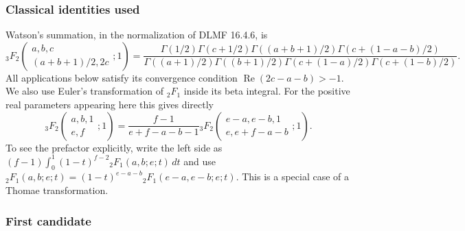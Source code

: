 \documentclass[11pt,a4paper]{article}
\theoremstyle{definition}
\theoremstyle{remark}
\numberwithin{equation}{section}
\begin{document}
\subsubsection{Classical identities used}

Watson's summation, in the normalization of DLMF 16.4.6, is
\begin{equation}\label{extra8-eq:double12-watson}
 {}_3F_2\left(\begin{matrix}a,b,c\\(a+b+1)/2,2c\end{matrix};1\right)
 =\frac{\Gamma(1/2)\Gamma(c+1/2)\Gamma((a+b+1)/2)
              \Gamma(c+(1-a-b)/2)}
             {\Gamma((a+1)/2)\Gamma((b+1)/2)
              \Gamma(c+(1-a)/2)\Gamma(c+(1-b)/2)}.
\end{equation}
All applications below satisfy its convergence condition
$\operatorname{Re}(2c-a-b)>-1$.
We also use Euler's transformation of ${}_2F_1$ inside its beta integral.
For the positive real parameters appearing here this gives directly
\begin{equation}\label{extra8-eq:double12-euler}
 {}_3F_2\left(\begin{matrix}a,b,1\\e,f\end{matrix};1\right)
 =\frac{f-1}{e+f-a-b-1}
 {}_3F_2\left(\begin{matrix}e-a,e-b,1\\e,e+f-a-b\end{matrix};1\right).
\end{equation}
To see the prefactor explicitly, write the left side as
$(f-1)\int_0^1(1-t)^{f-2}{}_2F_1(a,b;e;t)\,dt$ and use
${}_2F_1(a,b;e;t)=(1-t)^{e-a-b}{}_2F_1(e-a,e-b;e;t)$.
This is a special case of a Thomae transformation.

\subsubsection{First candidate}
\end{document}
